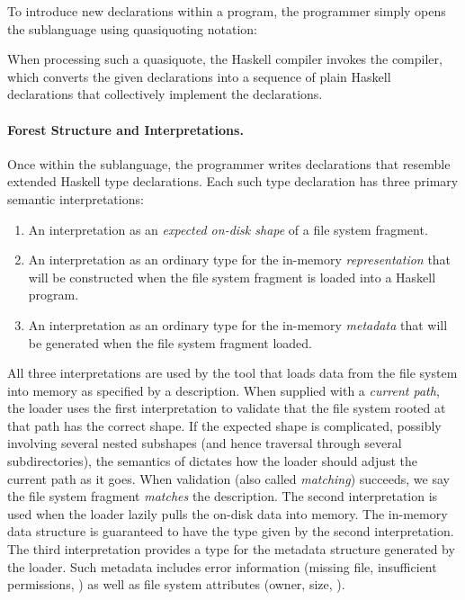 To introduce new \forest{} declarations within a \haskell{} program,
the programmer simply opens the \forest{} sublanguage using
quasiquoting notation:
\begin{code}
\end{code}
When processing such a quasiquote, the Haskell compiler invokes the
\forest{} compiler,  which converts the given \forest{} declarations
into a sequence of plain Haskell declarations that collectively
implement the \forest{} declarations.

\paragraph*{Forest Structure and Interpretations.}
Once within the \forest{} sublanguage, the programmer writes
declarations that resemble extended Haskell type declarations. 
Each such type declaration has three primary semantic interpretations: 
\begin{enumerate}
\item An interpretation as an {\em expected on-disk shape} of a file system 
    fragment.  
\item An interpretation as an ordinary \haskell{} type for the in-memory {\em representation}
    that will be constructed when the file system 
     fragment is loaded into 
     a Haskell program. 
\item An interpretation as an ordinary \haskell{} type for the in-memory 
   {\em metadata}
    that will be generated when the file system fragment loaded.
\end{enumerate}
All three interpretations are used by the tool that loads data from
the file system into memory as specified by a \forest{} description.  
When supplied with
a {\em current path}, the loader uses the first interpretation 
to validate that the file system rooted at that
path has the correct shape.  
If the expected shape is complicated,
possibly involving several nested subshapes (and hence
traversal through several subdirectories), the semantics of \forest{}
dictates how the loader should adjust the current path 
as it goes.  When validation (also called {\em matching}) succeeds, we
say the file system fragment {\em matches} the description.
The second interpretation is used when the loader
lazily pulls the on-disk data into memory. 
The in-memory data structure is guaranteed to have the 
\haskell{} type given by the second interpretation.
The third interpretation provides a
type for the metadata structure generated by the loader.
Such metadata includes error information (missing file, insufficient
permissions, \etc{})  as well as file system attributes (owner, size, \etc{}).

